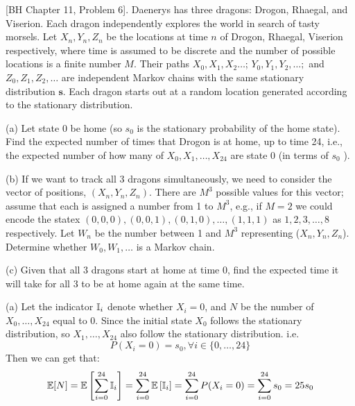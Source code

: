 \begin{homeworkProblem}

[BH Chapter 11, Problem 6]. Daenerys has three dragons: Drogon, Rhaegal, and Viserion. Each dragon independently explores the world in search of tasty morsels. Let $X_n, Y_n, Z_n$ be the locations at time $n$ of Drogon, Rhaegal, Viserion respectively, where time is assumed to be discrete and the number of possible locations is a finite number $M$. Their paths $X_0, X_1, X_2 \ldots$; $Y_0, Y_1, Y_2, \ldots ;$ and $Z_0, Z_1, Z_2, \ldots$ are independent Markov chains with the same stationary distribution $\mathbf{s}$. Each dragon starts out at a random location generated according to the stationary distribution.

(a) Let state 0 be home (so $s_0$ is the stationary probability of the home state). Find the expected number of times that Drogon is at home, up to time 24, i.e., the expected number of how many of $X_0, X_1, \ldots, X_{24}$ are state 0 (in terms of $s_0$ ).

(b) If we want to track all 3 dragons simultaneously, we need to consider the vector of positions, $\left(X_n, Y_n, Z_n\right)$. There are $M^3$ possible values for this vector; assume that each is assigned a number from 1 to $M^3$, e.g., if $M=2$ we could encode the statex $(0,0,0),(0,0,1),(0,1,0), \ldots,(1,1,1)$ as $1,2,3, \ldots, 8$ respectively. Let $W_n$ be the number between 1 and $M^3$ representing ($X_n, Y_n, Z_n$). Determine whether $W_0, W_1, \ldots$ is a Markov chain.

(c) Given that all 3 dragons start at home at time 0, find the expected time it will take for all 3 to be at home again at the same time.

\solution

(a) Let the indicator $\mathbb{I}_i$ denote whether $X_i=0$, and $N$ be the number of $X_0,\ldots,X_{24}$ equal to 0. Since the initial state $X_0$ follows the stationary distribution, so $X_1,\ldots,X_{24}$ also follow the stationary distribution. i.e.
$$P(X_i=0)=s_0, \forall i\in\{0,\ldots,24\}$$
Then we can get that:
$$\mathbb{E}[N] = \mathbb{E}\left[\sum_{i=0}^{24} \mathbb{I}_i\right] = \sum_{i=0}^{24} \mathbb{E}\left[\mathbb{I}_i\right] = \sum_{i=0}^{24} P(X_i=0) = \sum_{i=0}^{24} s_0 = 25s_0$$


\end{homeworkProblem}

